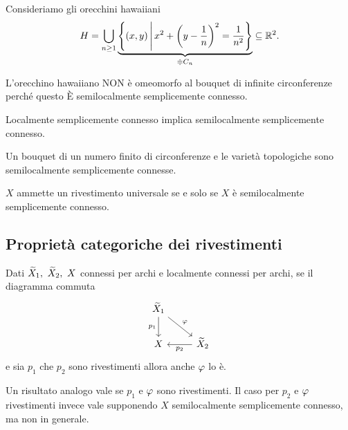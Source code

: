 \begin{multicols*}{2}
\begin{example}
Consideriamo gli orecchini hawaiiani
\[H=\bigcup_{n\geq 1}\underset{\doteqdot C_n}{\underbrace{\left\{(x,y)\,\middle|\, x^2+\left(y-\frac1n\right)^2=\frac1{n^2}\right\}}}\subseteq\mathbb{R}^2.\]
\end{example}
\begin{corollary}
L'orecchino hawaiiano NON \`e omeomorfo al bouquet di infinite circonferenze perch\'e questo \`E semilocalmente semplicemente connesso.
\end{corollary}

\begin{remark}
Localmente semplicemente connesso implica semilocalmente semplicemente connesso.
\end{remark}

\begin{example}
Un bouquet di un numero finito di circonferenze e le variet\`a topologiche sono semilocalmente semplicemente connesse.
\end{example}

\begin{theorem}\label{EsistenzaRivestimentiUniversali}
$X$ ammette un rivestimento universale se e solo se $X$ \`e semilocalmente semplicemente connesso.
\end{theorem}




\subsection{Propriet\`a categoriche dei rivestimenti}
\begin{lemma}\label{FattorizzazioneDiRivestimenti}
Dati $\widetilde{X}_1,\ \widetilde{X}_2,\ X$ connessi per archi e localmente connessi per archi, se il diagramma commuta
\[\begin{tikzcd}
	{\wt X_1} \\
	X & {\wt X_2}
	\arrow["\vp", from=1-1, to=2-2]
	\arrow["{p_2}", from=2-2, to=2-1]
	\arrow["{p_1}"', from=1-1, to=2-1]
\end{tikzcd}\]
e sia $p_1$ che $p_2$ sono rivestimenti allora anche $\varphi$ lo \`e.
\end{lemma}

\begin{remark}
Un risultato analogo vale se $p_1$ e $\varphi$ sono rivestimenti. Il caso per $p_2$ e $\varphi$ rivestimenti invece vale supponendo $X$ semilocalmente semplicemente connesso, ma non in generale.
\end{remark}



\end{multicols*}

